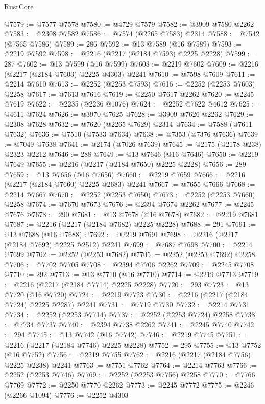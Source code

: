\begin{lexlean}{RustCore}
\begin{coremodule}
@7579 := @7577 @7578
@7580 := @4729 @7579
@7582 := @3909 @7580 @2262
@7583 := @2308 @7582
@7586 := @7574 (@2265 @7583) @2314
@7588 := @7542 (@7565 @7586)
@7589 := 286
@7592 := @13 @7589 (@16 @7589)
@7593 := @2219 @7592
@7598 := @2216 (@2217 (@2184 @7593) @2225 @2228)
@7599 := 287
@7602 := @13 @7599 (@16 @7599)
@7603 := @2219 @7602
@7609 := @2216 (@2217 (@2184 @7603) @2225 @4303) @2241
@7610 := @7598 @7609
@7611 := @2214 @7610
@7613 := @2252 (@2253 @7593)
@7616 := @2252 (@2253 @7603) @2258
@7617 := @7613 @7616
@7619 := @2250 @7617 @2262
@7620 := @2245 @7619
@7622 := @2235 (@2236 @1076)
@7624 := @2252 @7622 @4612
@7625 := @4611 @7624
@7626 := @3970 @7625
@7628 := @3909 @7626 @2262
@7629 := @2308 @7628
@7632 := @7620 (@2265 @7629) @2314
@7634 := @7588 (@7611 @7632)
@7636 := @7510 (@7533 @7634)
@7638 := @7353 (@7376 @7636)
@7639 := @7049 @7638
@7641 := @2174 (@7026 @7639)
@7645 := @2175 (@2178 @238) @2323 @2212
@7646 := 288
@7649 := @13 @7646 (@16 @7646)
@7650 := @2219 @7649
@7655 := @2216 (@2217 (@2184 @7650) @2225 @2228)
@7656 := 289
@7659 := @13 @7656 (@16 @7656)
@7660 := @2219 @7659
@7666 := @2216 (@2217 (@2184 @7660) @2225 @2683) @2241
@7667 := @7655 @7666
@7668 := @2214 @7667
@7670 := @2252 (@2253 @7650)
@7673 := @2252 (@2253 @7660) @2258
@7674 := @7670 @7673
@7676 := @2394 @7674 @2262
@7677 := @2245 @7676
@7678 := 290
@7681 := @13 @7678 (@16 @7678)
@7682 := @2219 @7681
@7687 := @2216 (@2217 (@2184 @7682) @2225 @2228)
@7688 := 291
@7691 := @13 @7688 (@16 @7688)
@7692 := @2219 @7691
@7698 := @2216 (@2217 (@2184 @7692) @2225 @2512) @2241
@7699 := @7687 @7698
@7700 := @2214 @7699
@7702 := @2252 (@2253 @7682)
@7705 := @2252 (@2253 @7692) @2258
@7706 := @7702 @7705
@7708 := @2394 @7706 @2262
@7709 := @2245 @7708
@7710 := 292
@7713 := @13 @7710 (@16 @7710)
@7714 := @2219 @7713
@7719 := @2216 (@2217 (@2184 @7714) @2225 @2228)
@7720 := 293
@7723 := @13 @7720 (@16 @7720)
@7724 := @2219 @7723
@7730 := @2216 (@2217 (@2184 @7724) @2225 @2287) @2241
@7731 := @7719 @7730
@7732 := @2214 @7731
@7734 := @2252 (@2253 @7714)
@7737 := @2252 (@2253 @7724) @2258
@7738 := @7734 @7737
@7740 := @2394 @7738 @2262
@7741 := @2245 @7740
@7742 := 294
@7745 := @13 @7742 (@16 @7742)
@7746 := @2219 @7745
@7751 := @2216 (@2217 (@2184 @7746) @2225 @2228)
@7752 := 295
@7755 := @13 @7752 (@16 @7752)
@7756 := @2219 @7755
@7762 := @2216 (@2217 (@2184 @7756) @2225 @2238) @2241
@7763 := @7751 @7762
@7764 := @2214 @7763
@7766 := @2252 (@2253 @7746)
@7769 := @2252 (@2253 @7756) @2258
@7770 := @7766 @7769
@7772 := @2250 @7770 @2262
@7773 := @2245 @7772
@7775 := @2246 (@2266 @1094)
@7776 := @2252 @4303

\end{coremodule}
\end{lexlean}
